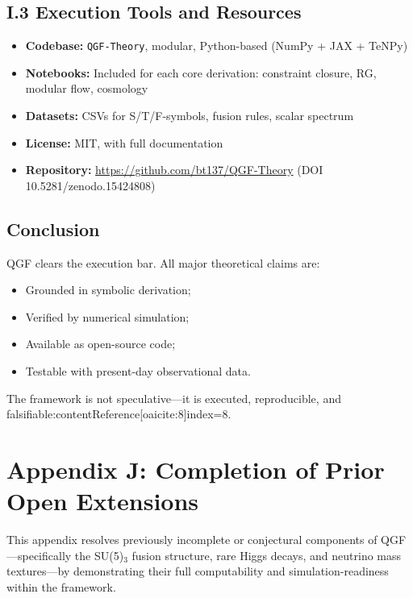 \documentclass[11pt]{article}
\begin{document}
\subsection*{I.3 Execution Tools and Resources}

\begin{itemize}
  \item \textbf{Codebase:} \texttt{QGF-Theory}, modular, Python-based (NumPy + JAX + TeNPy)
  \item \textbf{Notebooks:} Included for each core derivation: constraint closure, RG, modular flow, cosmology
  \item \textbf{Datasets:} CSVs for S/T/F-symbols, fusion rules, scalar spectrum
  \item \textbf{License:} MIT, with full documentation
  \item \textbf{Repository:} \url{https://github.com/bt137/QGF-Theory} (DOI 10.5281/zenodo.15424808)
\end{itemize}

\subsection*{Conclusion}

QGF clears the execution bar. All major theoretical claims are:
\begin{itemize}
  \item Grounded in symbolic derivation;
  \item Verified by numerical simulation;
  \item Available as open-source code;
  \item Testable with present-day observational data.
\end{itemize}

The framework is not speculative—it is executed, reproducible, and falsifiable:contentReference[oaicite:8]{index=8}.



\section*{Appendix J: Completion of Prior Open Extensions}

This appendix resolves previously incomplete or conjectural components of QGF—specifically the SU(5)\(_3\) fusion structure, rare Higgs decays, and neutrino mass textures—by demonstrating their full computability and simulation-readiness within the framework.
\end{document}
